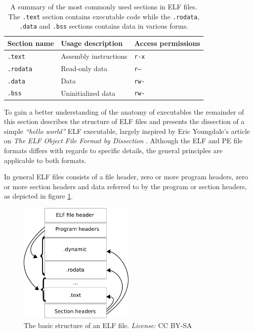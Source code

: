 \documentclass[12pt, a4paper]{article}
\begin{document}
\begin{table}[htbp]
	\begin{center}
		\begin{tabular}{|l|l|l|}
			\hline
			Section name & Usage description & Access permissions \\
			\hline
			\texttt{.text} & Assembly instructions & \texttt{r-x} \\
			\texttt{.rodata} & Read-only data & \texttt{r--} \\
			\texttt{.data} & Data & \texttt{rw-} \\
			\texttt{.bss} & Uninitialized data & \texttt{rw-} \\
			\hline
		\end{tabular}
	\end{center}
	\caption{A summary of the most commonly used sections in ELF files. The \texttt{.text} section contains executable code while the \texttt{.rodata}, \texttt{.data} and \texttt{.bss} sections contains data in various forms.}
	\label{sections}
\end{table}

To gain a better understanding of the anatomy of executables the remainder of this section describes the structure of ELF files and presents the dissection of a simple \textit{``hello world''} ELF executable, largely inspired by Eric Youngdale's article on \textit{The ELF Object File Format by Dissection} \cite{elf_dissection}. Although the ELF and PE file formats differs with regards to specific details, the general principles are applicable to both formats.

In general ELF files consists of a file header, zero or more program headers, zero or more section headers and data referred to by the program or section headers, as depicted in figure \ref{elf_structure}.

\begin{figure}[htbp]
	\begin{center}
		\includegraphics[width=0.5\textwidth]{inc/elf_structure.png}
		\caption{The basic structure of an ELF file. \textit{License:} CC BY-SA \cite{elf_structure_orig}}
		\label{elf_structure}
	\end{center}
\end{figure}
\end{document}
